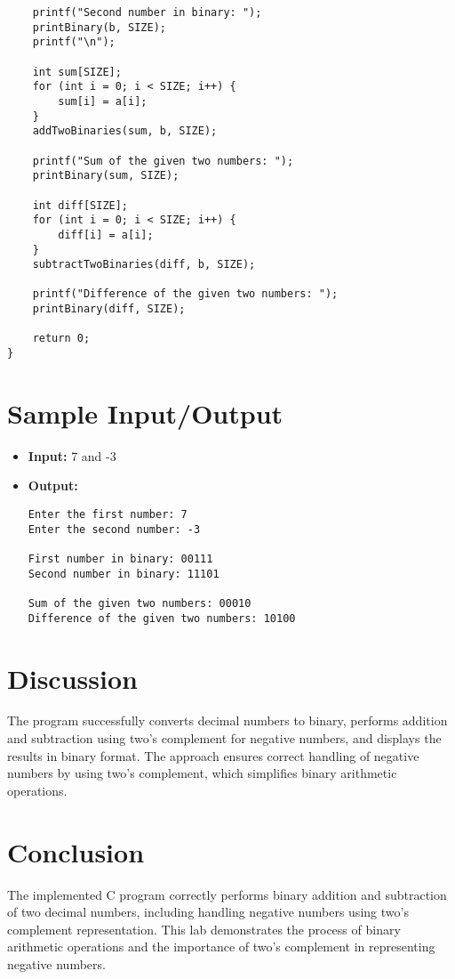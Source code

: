 \documentclass[a4paper,12pt]{article}
\begin{document}
\begin{verbatim}
    printf("Second number in binary: ");
    printBinary(b, SIZE);
    printf("\n");

    int sum[SIZE];
    for (int i = 0; i < SIZE; i++) {
        sum[i] = a[i];
    }
    addTwoBinaries(sum, b, SIZE);

    printf("Sum of the given two numbers: ");
    printBinary(sum, SIZE);

    int diff[SIZE];
    for (int i = 0; i < SIZE; i++) {
        diff[i] = a[i];
    }
    subtractTwoBinaries(diff, b, SIZE);

    printf("Difference of the given two numbers: ");
    printBinary(diff, SIZE);

    return 0;
}
\end{verbatim}

\section*{Sample Input/Output}
\begin{itemize}
    \item \textbf{Input:} 7 and -3
    \item \textbf{Output:}
    \begin{verbatim}
Enter the first number: 7
Enter the second number: -3

First number in binary: 00111
Second number in binary: 11101

Sum of the given two numbers: 00010
Difference of the given two numbers: 10100
    \end{verbatim}
\end{itemize}

\section*{Discussion}
The program successfully converts decimal numbers to binary, performs addition and subtraction using two's complement for negative numbers, and displays the results in binary format. The approach ensures correct handling of negative numbers by using two's complement, which simplifies binary arithmetic operations.

\section*{Conclusion}
The implemented C program correctly performs binary addition and subtraction of two decimal numbers, including handling negative numbers using two's complement representation. This lab demonstrates the process of binary arithmetic operations and the importance of two's complement in representing negative numbers.
\end{document}
